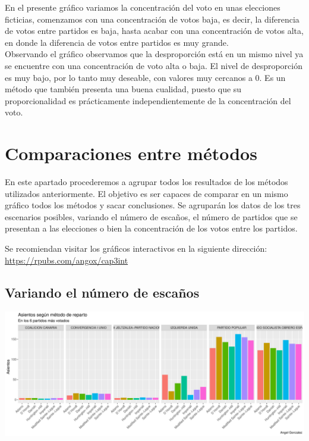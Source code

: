\documentclass[12pt,a4paper,]{book}
\numberwithin{dummy}{section}
\theoremstyle{ocrenumbox}
\theoremstyle{blacknumex}
\theoremstyle{blacknumbox}
\theoremstyle{ocrenum}
\theoremstyle{ocrenum}
\begin{document}
En el presente gráfico variamos la concentración del voto en unas
elecciones ficticias, comenzamos con una concentración de votos baja, es
decir, la diferencia de votos entre partidos es baja, hasta acabar con
una concentración de votos alta, en donde la diferencia de votos entre
partidos es muy grande.\\
Observando el gráfico observamos que la desproporción está en un mismo
nivel ya se encuentre con una concentración de voto alta o baja. El
nivel de desproporción es muy bajo, por lo tanto muy deseable, con
valores muy cercanos a 0. Es un método que también presenta una buena
cualidad, puesto que su proporcionalidad es prácticamente
independientemente de la concentración del voto.

\hypertarget{comparaciones-entre-muxe9todos}{%
\section{Comparaciones entre
métodos}\label{comparaciones-entre-muxe9todos}}

En este apartado procederemos a agrupar todos los resultados de los
métodos utilizados anteriormente. El objetivo es ser capaces de comparar
en un mismo gráfico todos los métodos y sacar conclusiones. Se agruparán
los datos de los tres escenarios posibles, variando el número de
escaños, el número de partidos que se presentan a las elecciones o bien
la concentración de los votos entre los partidos.

Se recomiendan visitar los gráficos interactivos en la siguiente
dirección: \url{https://rpubs.com/angox/cap3int}

\hypertarget{variando-el-nuxfamero-de-escauxf1os}{%
\subsection{Variando el número de
escaños}\label{variando-el-nuxfamero-de-escauxf1os}}

\begin{center}\includegraphics[width=0.95\linewidth]{figurasR/unnamed-chunk-64-1} \end{center}
\end{document}
